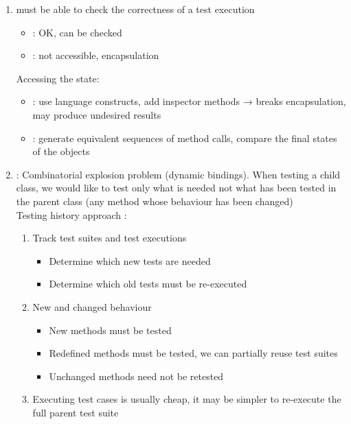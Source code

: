 \begin{enumerate}
    \item {} must be able to check the correctness of a test execution
    \begin{itemize}
        \item {} : OK, can be checked
        \item {} : not accessible, encapsulation
    \end{itemize}
    Accessing the state:
    \begin{itemize}
        \item {} : use language constructs, add inspector methods → breaks encapsulation, may produce undesired results
        \item {} : generate equivalent sequences of method calls, compare the final states of the objects
    \end{itemize}
    \item {} : Combinatorial explosion problem (dynamic bindings). When testing a child class, we would like to test only what is needed not what has been tested in the parent class (any method whose behaviour has been changed)\\
Testing history approach : 
\begin{enumerate}
    \item Track test suites and test executions
    \begin{itemize}
        \item Determine which new tests are needed
        \item Determine which old tests must be re-executed
    \end{itemize}
    \item New and changed behaviour
    \begin{itemize}
        \item New methods must be tested
        \item Redefined methods must be tested, we can partially reuse test suites
        \item Unchanged methods need not be retested
    \end{itemize}
    \item Executing test cases is usually cheap, it may be simpler to re-execute the full parent test suite
\end{enumerate}


\end{enumerate}
